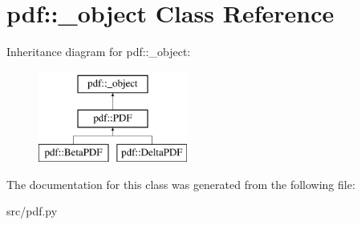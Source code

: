 \hypertarget{classpdf_1_1__object}{
\section{pdf::\_\-object Class Reference}
\label{df/d35/classpdf_1_1__object}
}
Inheritance diagram for pdf::\_\-object:\begin{figure}[H]
\begin{center}
\leavevmode
\includegraphics[height=3cm]{df/d35/classpdf_1_1__object}
\end{center}
\end{figure}


The documentation for this class was generated from the following file:\begin{DoxyCompactItemize}
\item 
src/pdf.py\end{DoxyCompactItemize}
